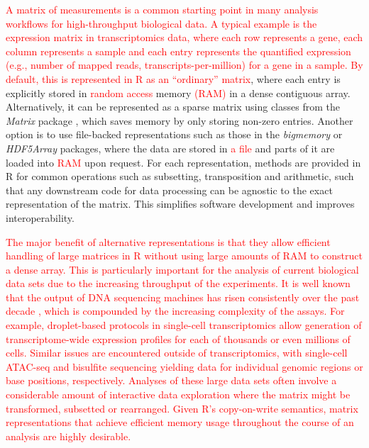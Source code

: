 \documentclass[10pt,letterpaper]{article}
\newcommand{\revised}[1]{\textcolor{red}{#1}}
\begin{document}
\revised{A matrix of measurements is a common starting point in many analysis workflows for high-throughput biological data.
A typical example is the expression matrix in transcriptomics data, where each row represents a gene, each column represents a sample and each entry represents the quantified expression (e.g., number of mapped reads, transcripts-per-million) for a gene in a sample.
By default, this is represented in R as an ``ordinary'' matrix}, where each entry is explicitly stored in \revised{random access} memory \revised{(RAM)} in a dense contiguous array.
Alternatively, it can be represented as a sparse matrix using classes from the \textit{Matrix} package \cite{bates2017matrix}, which saves memory by only storing non-zero entries.
Another option is to use file-backed representations such as those in the \textit{bigmemory} \cite{kane2013scalable} or \textit{HDF5Array} packages, where the data are stored in \revised{a file} and parts of it are loaded into \revised{RAM} upon request.
For each representation, methods are provided in R for common operations such as subsetting, transposition and arithmetic, such that any downstream code for data processing can be agnostic to the exact representation of the matrix.
This simplifies software development and improves interoperability.

\revised{The major benefit of alternative representations is that they allow efficient handling of large matrices in R without using large amounts of RAM to construct a dense array.
This is particularly important for the analysis of current biological data sets due to the increasing throughput of the experiments.
It is well known that the output of DNA sequencing machines has risen consistently over the past decade \cite{reuter2015high}, which is compounded by the increasing complexity of the assays.
For example, droplet-based protocols in single-cell transcriptomics \cite{macosko2015highly,klein2015droplet,zheng2017massively} allow generation of transcriptome-wide expression profiles for each of thousands or even millions of cells.
Similar issues are encountered outside of transcriptomics, with single-cell ATAC-seq \cite{buenrostro2015single} and bisulfite sequencing \cite{smallwood2014single} yielding data for individual genomic regions or base positions, respectively.
Analyses of these large data sets often involve a considerable amount of interactive data exploration where the matrix might be transformed, subsetted or rearranged.
Given R's copy-on-write semantics, matrix representations that achieve efficient memory usage throughout the course of an analysis are highly desirable.
}
\end{document}
